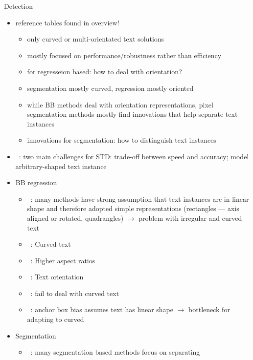 Detection
\begin{itemize}
    \item reference tables found in overview!
        \begin{itemize}
            \item only curved or multi-orientated text solutions
            \item mostly focused on performance/robustness rather than efficiency
            \item for regresseion based: how to deal with orientation?
            \item segmentation mostly curved, regression mostly oriented
            \item while BB methods deal with orientation representations, pixel segmentation methods
                mostly find innovations that help separate text instances
            \item innovations for segmentation: how to distinguish text instances
        \end{itemize}
    \item~\cite{wang_efficient_2019}: two main challenges for \ac{STD}:
        trade-off between speed and accuracy; model arbitrary-shaped text instance
    \item BB regression
        \begin{itemize}
            \item~\cite{ferrari_textsnake_2018}: many methods have strong assumption that text
                instances are in linear shape and therefore adopted simple representations
                (rectangles --- axis aligned or rotated, quadrangles)
                $\rightarrow$ problem with irregular and curved text
            \item~\citep{long_scene_2021}: Curved text
            \item~\cite{long_scene_2021,shi_detecting_2017}: Higher aspect ratios
            \item~\cite{shi_detecting_2017}: Text orientation
            \item~\cite{wang_shape_2019}: fail to deal with curved text
            \item~\cite{xu_textfield_2019}: anchor box bias assumes text has linear shape
                $\rightarrow$ bottleneck for adapting to curved
        \end{itemize}
    \item Segmentation
        \begin{itemize}
            \item~\cite{xu_textfield_2019}: many segmentation based methods focus on separating

\end{itemize}
\end{itemize}
